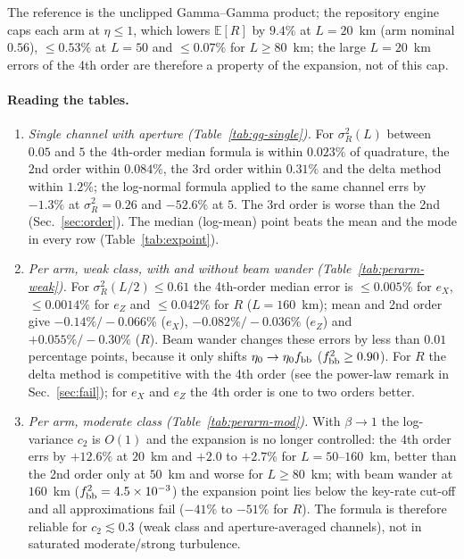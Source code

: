 \documentclass[11pt,a4paper]{article}
\theoremstyle{plain}
\theoremstyle{remark}
\begin{document}
\begin{table}[htbp]
\begin{tabular}{rcccccccccccc}
\bottomrule
\end{tabular}
\par\smallskip
\begin{minipage}{0.95\linewidth}\footnotesize The reference is the unclipped Gamma--Gamma product; the repository engine caps each arm at $\eta\le1$, which lowers $\mathbb E[R]$ by $9.4\%$ at $L=20$~km (arm nominal $0.56$), $\le0.53\%$ at $L=50$ and $\le0.07\%$ for $L\ge80$~km; the large $L=20$~km errors of the 4th order are therefore a property of the expansion, not of this cap.\end{minipage}
\end{table}

\paragraph{Reading the tables.}
\begin{enumerate}
\item \emph{Single channel with aperture (Table~\ref{tab:gg-single}).} For $\sigma_R^2(L)$ between $0.05$ and $5$ the 4th-order median formula is within $0.023\%$ of quadrature, the 2nd order within $0.084\%$, the 3rd order within $0.31\%$ and the delta method within $1.2\%$; the log-normal formula applied to the same channel errs by $-1.3\%$ at $\sigma_R^2=0.26$ and $-52.6\%$ at $5$. The 3rd order is worse than the 2nd (Sec.~\ref{sec:order}). The median (log-mean) point beats the mean and the mode in every row (Table~\ref{tab:expoint}).
\item \emph{Per arm, weak class, with and without beam wander (Table~\ref{tab:perarm-weak}).} For $\sigma_R^2(L/2)\le0.61$ the 4th-order median error is $\le0.005\%$ for $e_X$, $\le0.0014\%$ for $e_Z$ and $\le0.042\%$ for $R$ ($L=160$~km); mean and 2nd order give $-0.14\%/-0.066\%$ ($e_X$), $-0.082\%/-0.036\%$ ($e_Z$) and $+0.055\%/-0.30\%$ ($R$). Beam wander changes these errors by less than $0.01$ percentage points, because it only shifts $\eta_0\to\eta_0f_{\rm bb}$ ($f_{\rm bb}^2\ge0.90$). For $R$ the delta method is competitive with the 4th order (see the power-law remark in Sec.~\ref{sec:fail}); for $e_X$ and $e_Z$ the 4th order is one to two orders better.
\item \emph{Per arm, moderate class (Table~\ref{tab:perarm-mod}).} With $\beta\to1$ the log-variance $c_2$ is $O(1)$ and the expansion is no longer controlled: the 4th order errs by $+12.6\%$ at $20$~km and $+2.0$ to $+2.7\%$ for $L=50$--$160$~km, better than the 2nd order only at $50$~km and worse for $L\ge80$~km; with beam wander at $160$~km ($f_{\rm bb}^2=4.5\times10^{-3}$) the expansion point lies below the key-rate cut-off and all approximations fail ($-41\%$ to $-51\%$ for $R$). The formula is therefore reliable for $c_2\lesssim0.3$ (weak class and aperture-averaged channels), not in saturated moderate/strong turbulence.
\end{enumerate}
\end{document}
